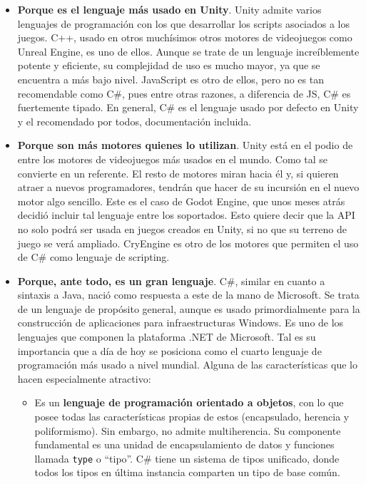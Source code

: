 \begin{itemize}
\item\textbf{Porque es el lenguaje más usado en Unity}. Unity admite varios lenguajes de programación con los que desarrollar los scripts asociados a los juegos. C++, usado en otros muchísimos otros motores de videojuegos como Unreal Engine, es uno de ellos. Aunque se trate de un lenguaje increíblemente potente y eficiente, su complejidad de uso es mucho mayor, ya que se encuentra a más bajo nivel. JavaScript es otro de ellos, pero no es tan recomendable como C\#, pues entre otras razones, a diferencia de JS, C\# es fuertemente tipado\cite{unityinaction}. En general, C\# es el lenguaje usado por defecto en Unity y el recomendado por todos, documentación incluida.
\item\textbf{Porque son más motores quienes lo utilizan}. Unity está en el podio de entre los motores de videojuegos más usados en el mundo. Como tal se convierte en un referente. El resto de motores miran hacia él y, si quieren atraer a nuevos programadores, tendrán que hacer de su incursión en el nuevo motor algo sencillo. Este es el caso de Godot Engine, que unos meses atrás decidió incluir tal lenguaje entre los soportados\cite{godotcs}. Esto quiere decir que la API no solo podrá ser usada en juegos creados en Unity, si no que su terreno de juego se verá ampliado. CryEngine es otro de los motores que permiten el uso de C\# como lenguaje de scripting.
\item\textbf{Porque, ante todo, es un gran lenguaje}. C\#, similar en cuanto a sintaxis a Java, nació como respuesta a este de la mano de Microsoft. Se trata de un lenguaje de propósito general, aunque es usado primordialmente para la construcción de aplicaciones para infraestructuras Windows. Es uno de los lenguajes que componen la plataforma .NET de Microsoft. Tal es su importancia que a día de hoy se posiciona como el cuarto lenguaje de programación más usado a nivel mundial\cite{csisfamous}. Alguna de las características que lo hacen especialmente atractivo:
\begin{itemize}
\item Es un \textbf{lenguaje de programación orientado a objetos}, con lo que posee todas las características propias de estos (encapsulado, herencia y poliformismo). Sin embargo, no admite multiherencia. Su componente fundamental es una unidad de encapsulamiento de datos y
funciones llamada \texttt{type} o ``tipo''. C\# tiene un sistema de tipos unificado, donde todos los tipos en última instancia comparten un tipo de base común.

\end{itemize}
\end{itemize}
